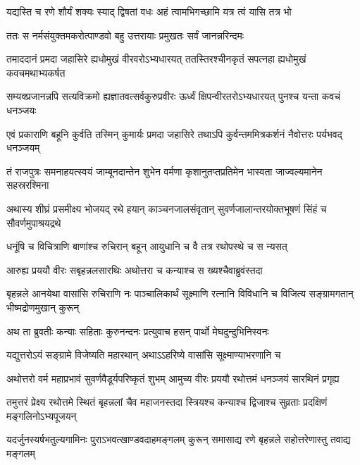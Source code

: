 \twolineshloka
{यद्यस्ति च रणे शौर्यं शक्यः स्याद् द्विषतां वधः}
{अहं त्वामभिगच्छामि यत्र त्वं यासि तत्र भो}



\twolineshloka
{ततः स नर्मसंयुक्तमकरोत्पाण्डवो बहु}
{उत्तरायाः प्रमुखतः सर्वं जानन्नरिन्दमः}


\fourlineindentedshloka
{तमाददानं प्रमदा जहासिरे}
{ह्यधोमुखं वीरवरोऽभ्यधारयत्}
{ततस्तिरश्चीनकृतं सपत्नहा}
{ह्यधोमुखं कवचमथाभ्यकर्षत}


\fourlineindentedshloka
{सम्यक्प्रजानन्नपि सत्यविक्रमो}
{ह्यज्ञातवत्सर्वकुरुप्रवीरः}
{ऊर्ध्वं क्षिपन्वीरतरोऽभ्यधारयत्}
{पुनश्च यन्ता कवचं धनञ्जयः}


\fourlineindentedshloka
{एवं प्रकाराणि बहूनि कुर्वति}
{तस्मिन् कुमार्यः प्रमदा जहासिरे}
{तथाऽपि कुर्वन्तममित्रकर्शनं}
{नैवोत्तरः पर्यभवद् धनञ्जयम्}


\fourlineindentedshloka
{तं राजपुत्रः समनाहयत्स्वयं}
{जाम्बूनदान्तेन शुभेन वर्मणा}
{कृशानुतप्तप्रतिमेन भास्वता}
{जाज्वल्यमानेन सहस्ररश्मिना}


\fourlineindentedshloka
{अथास्य शीघ्रं प्रसमीक्ष्य भोजयद्}
{रथे हयान् काञ्चनजालसंवृतान्}
{सुवर्णजालान्तरयोक्तभूषणं}
{सिंहं च सौवर्णमुपाश्रयद्रथे}


\twolineshloka
{धनूंषि च विचित्राणि बाणांश्च रुचिरान् बहून्}
{आयुधानि च वै तत्र रथोपस्थे च स न्यसत्}


\twolineshloka
{आरुह्य प्रययौ वीरः सबृहन्नलसारथिः}
{अथोत्तरा च कन्याश्च स ख्यश्चैवाब्रुवंस्तदा}


\threelineshloka
{बृहन्नले आनयेथा वासांसि रुचिराणि नः}
{पाञ्चालिकार्थं सूक्ष्माणि रत्नानि विविधानि च}
{विजित्य सङ्ग्रामगतान् भीष्मद्रोणमुखान् कुरून्}


\twolineshloka
{अथ ता ब्रुवतीः कन्याः सहिताः कुरुनन्दनः}
{प्रत्युवाच हसन् पार्थो मेघदुन्दुभिनिस्वनः}


\twolineshloka
{यद्युत्तरोऽयं सङ्ग्रामे विजेष्यति महारथान्}
{अथाऽऽहरिष्ये वासांसि सूक्ष्माण्याभरणानि च}



\fourlineindentedshloka
{अथोत्तरो वर्म महाप्रभावं}
{सुवर्णवैडूर्यपरिष्कृतं शुभम्}
{आमुच्य वीरः प्रययौ रथोत्तमं}
{धनञ्जयं सारथिनं प्रगृह्य}


\fourlineindentedshloka
{तमुत्तरं प्रेक्ष्य रथोत्तमे स्थितं}
{बृहन्नलां चैव महाजनस्तदा}
{स्त्रियश्च कन्याश्च द्विजाश्च सुव्रताः}
{प्रदक्षिणं मङ्गलिनोऽभ्यपूजयन्}


\fourlineindentedshloka
{यदर्जुनस्यर्षभतुल्यगामिनः}
{पुराऽभवत्खाण्डवदाहमङ्गलम्}
{कुरून् समासाद्य रणे बृहन्नले}
{सहोत्तरेणास्तु तवाद्य मङ्गलम्}

